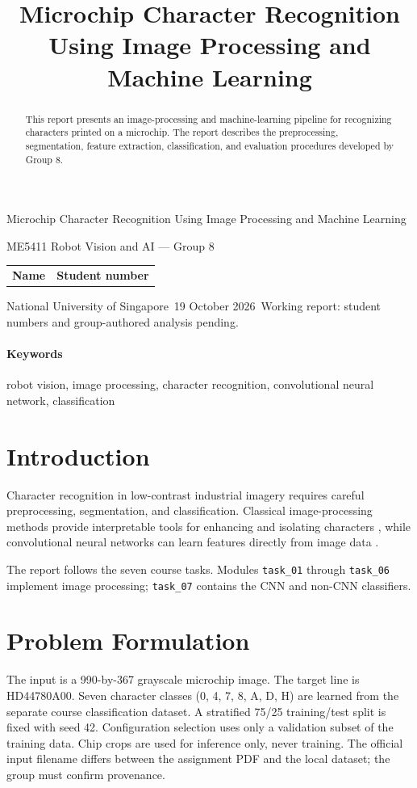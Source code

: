 \documentclass[11pt,a4paper]{article}
\title{Microchip Character Recognition Using Image Processing and Machine Learning}
\begin{document}
\begin{titlepage}
\centering
{\LARGE Microchip Character Recognition Using Image Processing and Machine Learning\par}
\vspace{15mm}
{\Large ME5411 Robot Vision and AI --- Group 8\par}
\vspace{10mm}
\begin{tabular}{ll}
\textbf{Name} & \textbf{Student number} \\

\end{tabular}
\vfill
National University of Singapore\
19 October 2026\
Working report: student numbers and group-authored analysis pending.
\end{titlepage}

\begin{abstract}
This report presents an image-processing and machine-learning pipeline for
recognizing characters printed on a microchip. The report describes
the preprocessing, segmentation, feature extraction, classification, and
evaluation procedures developed by Group 8.
\end{abstract}

\paragraph{Keywords}
robot vision, image processing, character recognition, convolutional neural
network, classification


\section{Introduction}
Character recognition in low-contrast industrial imagery requires careful
preprocessing, segmentation, and classification. Classical image-processing
methods provide interpretable tools for enhancing and isolating characters
\cite{gonzalez2018digital}, while convolutional neural networks can learn
features directly from image data \cite{lecun1998gradient}.

The report follows the seven course tasks. Modules \texttt{task\_01}
through \texttt{task\_06} implement image processing;
\texttt{task\_07} contains the CNN and non-CNN classifiers.

\section{Problem Formulation}
The input is a 990-by-367 grayscale microchip image. The target line is
HD44780A00. Seven character classes (0, 4, 7, 8, A, D, H) are learned
from the separate course classification dataset. A stratified 75/25
training/test split is fixed with seed 42. Configuration selection uses
only a validation subset of the training data. Chip crops are used for
inference only, never training. The official input filename differs between
the assignment PDF and the local dataset; the group must confirm provenance.
\end{document}
